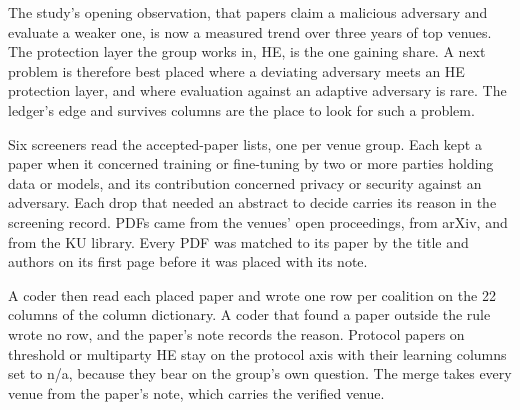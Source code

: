 \documentclass{labreport}
\begin{document}
\lrchanges
The study's opening observation, that papers claim a malicious adversary and
evaluate a weaker one, is now a measured trend over three years of top venues.
The protection layer the group works in, HE, is the one gaining share. A next
problem is therefore best placed where a deviating adversary meets an HE
protection layer, and where evaluation against an adaptive adversary is rare.
The ledger's edge and survives columns are the place to look for such a
problem.

\lrmethod
Six screeners read the accepted-paper lists, one per venue group. Each kept a
paper when it concerned training or fine-tuning by two or more parties holding
data or models, and its contribution concerned privacy or security against an
adversary. Each drop that needed an abstract to decide carries its reason in
the screening record. PDFs came from the venues' open proceedings, from arXiv,
and from the KU library. Every PDF was matched to its paper by the title and
authors on its first page before it was placed with its note.

A coder then read each placed paper and wrote one row per coalition on the 22
columns of the column dictionary. A coder that found a paper outside the rule
wrote no row, and the paper's note records the reason. Protocol papers on
threshold or multiparty HE stay on the protocol axis with their learning
columns set to n/a, because they bear on the group's own question. The merge
takes every venue from the paper's note, which carries the verified venue.

{\small


}
\end{document}
